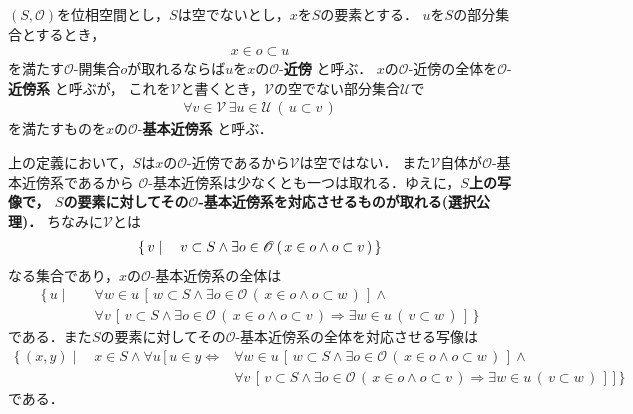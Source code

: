 	\begin{screen}
		\begin{dfn}[近傍]
			$(S,\mathscr{O})$を位相空間とし，$S$は空でないとし，$x$を$S$の要素とする．
			$u$を$S$の部分集合とするとき，
			\begin{align}
				x \in o \subset u
			\end{align}
			を満たす$\mathscr{O}$-開集合$o$が取れるならば$u$を$x$の$\mathscr{O}$-{\bf 近傍}
			と呼ぶ．
			$x$の$\mathscr{O}$-近傍の全体を$\mathscr{O}$-{\bf 近傍系}
			と呼ぶが，
			これを$\mathscr{V}$と書くとき，$\mathscr{V}$の空でない部分集合$\mathscr{U}$で
			\begin{align}
				\forall v \in \mathscr{V}\, \exists u \in \mathscr{U}\,
				(\, u \subset v\, )
			\end{align}
			を満たすものを$x$の$\mathscr{O}$-{\bf 基本近傍系}
			と呼ぶ．
		\end{dfn}
	\end{screen}
	
	上の定義において，$S$は$x$の$\mathscr{O}$-近傍であるから$\mathscr{V}$は空ではない．
	また$\mathscr{V}$自体が$\mathscr{O}$-基本近傍系であるから
	$\mathscr{O}$-基本近傍系は少なくとも一つは取れる．ゆえに，{\bf $S$上の写像で，
	$S$の要素に対してその$\mathscr{O}$-基本近傍系を対応させるものが取れる(選択公理)．}
	ちなみに$\mathscr{V}$とは
	\begin{align}
		\left\{\, v \mid \quad v \subset S \wedge \exists o \in \mathscr{O}\, (\, x \in o \wedge o \subset v\, )\, \right\}
	\end{align}
	なる集合であり，$x$の$\mathscr{O}$-基本近傍系の全体は
	\begin{align}
		\{\, u \mid \quad &\forall w \in u\, [\, w \subset S \wedge \exists o \in \mathscr{O}\, (\, x \in o \wedge o \subset w\, )\, ] \wedge \\
		&\forall v\, \left[\, v \subset S \wedge \exists o \in \mathscr{O}\, (\, x \in o \wedge o \subset v\, )
		\Longrightarrow \exists w \in u\, (\, v \subset w\, )\, \right]\, \}
	\end{align}
	である．また$S$の要素に対してその$\mathscr{O}$-基本近傍系の全体を対応させる写像は
	\begin{align}
		\{\, (x,y) \mid \quad x \in S \wedge
		\forall u\, [\, u \in y \Longleftrightarrow 
		&\forall w \in u\, [\, w \subset S \wedge \exists o \in \mathscr{O}\, (\, x \in o \wedge o \subset w\, )\, ] \wedge \\
		&\forall v\, \left[\, v \subset S \wedge \exists o \in \mathscr{O}\, (\, x \in o \wedge o \subset v\, )
		\Longrightarrow \exists w \in u\, (\, v \subset w\, )\, \right]\, ]\, \}
	\end{align}
	である．
	
